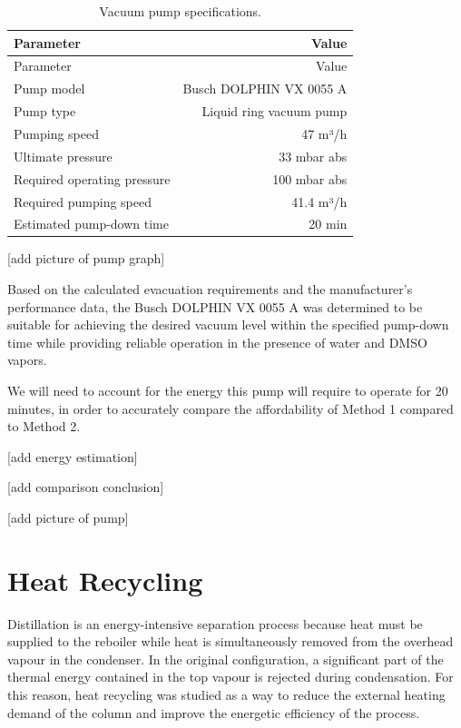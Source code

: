 \begin{longtable}[]{@{}lr@{}}
\caption{Vacuum pump specifications.
\label{tab:Vacuum pump specifications}}\tabularnewline
\toprule\noalign{}
Parameter & Value \\
\midrule\noalign{}
\endfirsthead
\toprule\noalign{}
Parameter & Value \\
\midrule\noalign{}
\endhead
\bottomrule\noalign{}
\endlastfoot
Pump model & Busch DOLPHIN VX 0055 A \\
Pump type & Liquid ring vacuum pump \\
Pumping speed & 47 m³/h \\
Ultimate pressure & 33 mbar abs \\
Required operating pressure & 100 mbar abs \\
Required pumping speed & 41.4 m³/h \\
Estimated pump-down time & 20 min \\
\end{longtable}

{[}add picture of pump graph{]}

Based on the calculated evacuation requirements and the manufacturer's
performance data, the Busch DOLPHIN VX 0055 A was determined to be
suitable for achieving the desired vacuum level within the specified
pump-down time while providing reliable operation in the presence of
water and DMSO vapors.

We will need to account for the energy this pump will require to operate
for 20 minutes, in order to accurately compare the affordability of
Method 1 compared to Method 2.

{[}add energy estimation{]}

{[}add comparison conclusion{]}

{[}add picture of pump{]}

\chapter{Heat Recycling}\label{heat-recycling}

Distillation is an energy-intensive separation process because heat must
be supplied to the reboiler while heat is simultaneously removed from
the overhead vapour in the condenser. In the original configuration, a
significant part of the thermal energy contained in the top vapour is
rejected during condensation. For this reason, heat recycling was
studied as a way to reduce the external heating demand of the column and
improve the energetic efficiency of the process.

